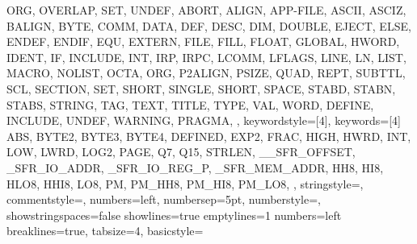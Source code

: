 {{                ORG, OVERLAP,
                SET,
                UNDEF, 
                ABORT, ALIGN, APP-FILE, ASCII, ASCIZ, 
                BALIGN, BYTE, 
                COMM, 
                DATA, DEF, DESC, DIM, DOUBLE, 
                EJECT, ELSE, ENDEF, ENDIF, EQU, EXTERN, 
                FILE, FILL, FLOAT, 
                GLOBAL, 
                HWORD,
                IDENT, IF, INCLUDE, INT, IRP, IRPC, 
                LCOMM, LFLAGS, LINE, LN, LIST, 
                MACRO,
                NOLIST, 
                OCTA, ORG, 
                P2ALIGN, PSIZE, 
                QUAD, 
                REPT, 
                SUBTTL, SCL, SECTION, SET, SHORT, 
                SINGLE, SHORT, SPACE, STABD, STABN, 
                STABS, STRING, 
                TAG, TEXT, TITLE, TYPE, 
                VAL, 
                WORD,
                DEFINE, INCLUDE, UNDEF, WARNING, PRAGMA, 
                }, 
%
%
  keywordstyle=[4]\color{arduinoGreen},
  keywords=[4]{  %
                ABS, 
                BYTE2, BYTE3, BYTE4, 
                DEFINED,
                EXP2,
                FRAC, 
                HIGH, HWRD, 
                INT,
                LOW, LWRD, LOG2, 
                PAGE, 
                Q7, Q15, 
                STRLEN,
                __SFR_OFFSET, _SFR_IO_ADDR, _SFR_IO_REG_P,
                _SFR_MEM_ADDR,
                HH8, HI8, HLO8, HHI8,
                LO8,
                PM, PM_HH8, PM_HI8, PM_LO8,
                },      
%
%
  stringstyle=\color{arduinoDarkBlue},    
  commentstyle=\color{arduinoGrey},    
%          
%   
  numbers=left,                    
  numbersep=5pt,                   
  numberstyle=\color{arduinoGrey}, 
  showstringspaces=false
  showlines=true
  emptylines=1
  numbers=left   
%
%
  breaklines=true,                    %
  tabsize=4,         
  basicstyle=\ttfamily  
}
